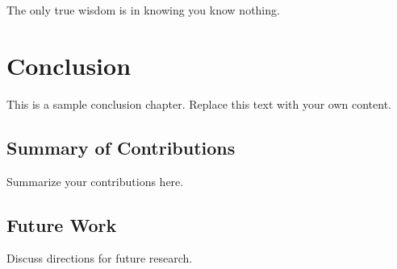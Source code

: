 
\begin{savequote}[75mm]
The only true wisdom is in knowing you know nothing.
\end{savequote}

\chapter{Conclusion}
\label{ch:conclusion}

This is a sample conclusion chapter. Replace this text with your own content.

\section{Summary of Contributions}

Summarize your contributions here.

\section{Future Work}

Discuss directions for future research.
